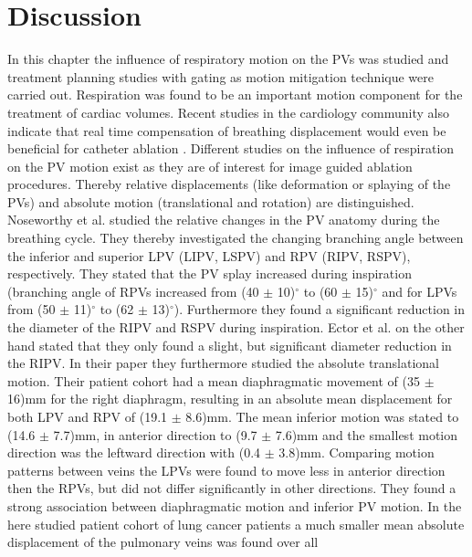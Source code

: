 \section{Discussion}
In this chapter the influence of respiratory motion on the PVs was studied and treatment planning studies with gating as motion 
mitigation technique were carried out. Respiration was found to be an important motion component for the treatment of cardiac volumes. 
Recent studies in the cardiology community also indicate that real time compensation of breathing displacement 
would even be beneficial for catheter ablation \cite{Kum12, Frie12}.\newline
\newline
Different studies on the influence of respiration on the PV motion exist as they are of interest for image guided ablation procedures. 
Thereby relative displacements (like deformation or splaying of the PVs) and absolute motion (translational and rotation) are distinguished. 
Noseworthy et al. \cite{Nos05} studied the relative changes in the PV anatomy during the breathing cycle. They thereby investigated the changing 
branching angle between the inferior and superior LPV (LIPV, LSPV) and RPV (RIPV, RSPV), respectively. They stated that the PV splay increased 
during inspiration (branching angle of RPVs increased from (40 $\pm$ 10)$^\circ$ to (60 $\pm$ 15)$^\circ$ and for LPVs 
from (50 $\pm$ 11)$^\circ$ to (62 $\pm$ 13)$^\circ$). Furthermore they found a significant reduction in 
the diameter of the RIPV and RSPV during inspiration. Ector et al. \cite{Ect08} on the other hand stated that they only found a slight, 
but significant diameter reduction in the RIPV. In their paper they furthermore studied the absolute translational motion. 
Their patient cohort had a mean diaphragmatic movement of (35 $\pm$ 16)mm for the right diaphragm, resulting in an absolute mean displacement 
for both LPV and RPV of (19.1 $\pm$ 8.6)mm. The mean inferior motion was stated 
to (14.6 $\pm$ 7.7)mm, in anterior direction to (9.7 $\pm$ 7.6)mm and the smallest motion direction was the leftward direction with 
(0.4 $\pm$ 3.8)mm. Comparing motion patterns between veins the LPVs were found to move less in anterior direction then the RPVs, but did 
not differ significantly in other directions. They found a strong association between diaphragmatic motion and inferior PV motion.\newline
\newline
In the here studied patient cohort of lung cancer patients a much smaller mean absolute displacement of the pulmonary veins was found over all 
